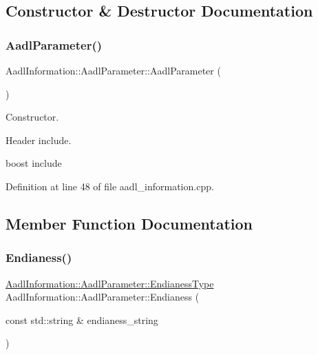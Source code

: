 \subsection{Constructor \& Destructor Documentation}
\mbox{\label{structAadlInformation_1_1AadlParameter_a0055be51ef0f5c3bbca5ba76ad38a0f1}} 
\subsubsection{\texorpdfstring{Aadl\+Parameter()}{AadlParameter()}}
{\footnotesize\ttfamily Aadl\+Information\+::\+Aadl\+Parameter\+::\+Aadl\+Parameter (\begin{DoxyParamCaption}{ }\end{DoxyParamCaption})}



Constructor. 

Header include.

boost include 

Definition at line 48 of file aadl\+\_\+information.\+cpp.



\subsection{Member Function Documentation}
\mbox{\label{structAadlInformation_1_1AadlParameter_ab6f9fc5ad1d0f77d9a02967917d18422}} 
\subsubsection{\texorpdfstring{Endianess()}{Endianess()}}
{\footnotesize\ttfamily \hyperlink{structAadlInformation_1_1AadlParameter_a1b095cc6220ca218732206b6c3994192}{Aadl\+Information\+::\+Aadl\+Parameter\+::\+Endianess\+Type} Aadl\+Information\+::\+Aadl\+Parameter\+::\+Endianess (\begin{DoxyParamCaption}\item[{const std\+::string \&}]{endianess\+\_\+string }\end{DoxyParamCaption})\hspace{0.3cm}{\ttfamily [static]}}




